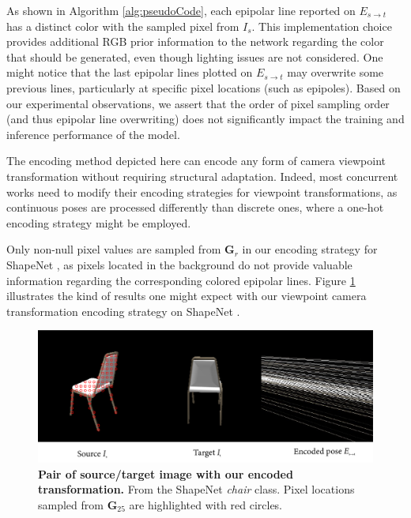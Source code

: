 As shown in Algorithm \ref{alg:pseudoCode}, each epipolar line reported on $E_{s\xrightarrow{}t}$ has a distinct color with the sampled pixel from $I_s$. This implementation choice provides additional RGB prior information to the network regarding the color that should be generated, even though lighting issues are not considered. One might notice that the last epipolar lines plotted on $E_{s\xrightarrow{}t}$ may overwrite some previous lines, particularly at specific pixel locations (such as epipoles). Based on our experimental observations, we assert that the order of pixel sampling order (and thus epipolar line overwriting) does not significantly impact the training and inference performance of the model. 

The encoding method depicted here can encode any form of camera viewpoint transformation without requiring structural adaptation. Indeed, most concurrent works need to modify their encoding strategies for viewpoint transformations, as continuous poses are processed differently than discrete ones, where a one-hot encoding strategy might be employed. 


Only non-null pixel values are sampled from $\textbf{G}_{r}$ in our encoding strategy for ShapeNet \citep{chang2015shapenet}, as pixels located in the background do not provide valuable information regarding the corresponding colored epipolar lines. Figure \ref{fig:examplePoseEncoded} illustrates the kind of results one might expect with our viewpoint camera transformation encoding strategy on ShapeNet \citep{chang2015shapenet}. 


\begin{figure}[h!]
\begin{center}
\includegraphics[width=\textwidth]{images/epipolarnvs/EpipolarNVS_encoded.png}
\end{center}
\caption{\textbf{Pair of source/target image with our encoded transformation.} From the ShapeNet \citep{chang2015shapenet} \textit{chair} class. Pixel locations sampled from $\textbf{G}_{25}$ are highlighted with red circles.}
\label{fig:examplePoseEncoded}
\end{figure}


